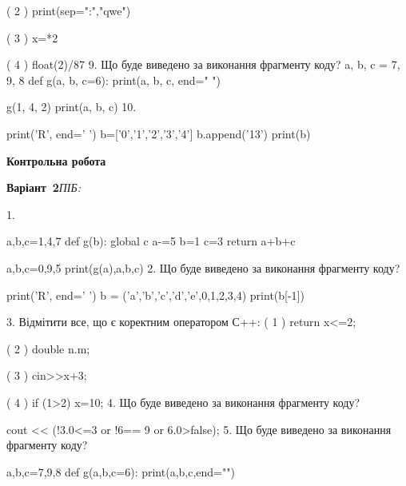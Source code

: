 \documentclass[11pt]{article}
\begin{document}
( 2 ) print(sep=":","qwe")

( 3 ) x=*2

( 4 ) float(2)/87
\vspace{5mm}
9. Що буде виведено за виконання фрагменту коду?
a, b, c = 7, 9, 8
def g(a, b, c=6):
    print(a, b, c, end=" ")

g(1, 4, 2)
print(a, b, c)
\vspace{5mm}
10. 

print('R', end=' ')
b=['0','1','2','3','4']
b.append('13')
print(b)

\vspace{5mm}










\newpage

\newpage

{\large\textbf{Контрольна робота}}

\textbf{Варіант \No\,2}\hfill \textit{ПІБ:}\,\underline{\hspace{60mm}}
\vspace{4mm}

1. 

a,b,c=1,4,7
def g(b):
global c    a-=5
    b=1
    c=3
    return a+b+c

a,b,c=0,9,5
print(g(a),a,b,c)
\vspace{5mm}
2. Що буде виведено за виконання фрагменту коду?

print('R', end=' ')
b = ('a','b','c','d','e',0,1,2,3,4)
print(b[-1])

\vspace{5mm}
3. %
Відмітити все, що є коректним оператором С++:
( 1 ) return x<=2;

( 2 ) double n.m;

( 3 ) cin>>x+3;

( 4 ) if (1>2) x=10;
\vspace{5mm}
4. Що буде виведено за виконання фрагменту коду?

cout << (!3.0<=3 or !6== 9 or 6.0>false);
\vspace{5mm}
5. Що буде виведено за виконання фрагменту коду?

a,b,c=7,9,8
def g(a,b,c=6):
    print(a,b,c,end="")
\end{document}

